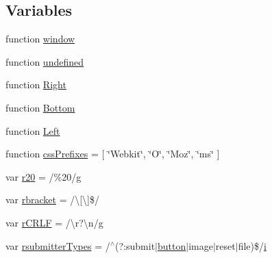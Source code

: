 \subsection*{Variables}
\begin{DoxyCompactItemize}
\item 
function \hyperlink{obj_2_release_2_package_2_package_tmp_2_scripts_2jquery-1_810_82_8js_a04a8a2bbfa9c15500892b8e5033d625b}{window}
\item 
function \hyperlink{obj_2_release_2_package_2_package_tmp_2_scripts_2jquery-1_810_82_8js_a08113a236cc18d2a9d5ce27e638012be}{undefined}
\item 
function \hyperlink{obj_2_release_2_package_2_package_tmp_2_scripts_2jquery-1_810_82_8js_ac7f66efc33d974809d85fc5bdb00c6eb}{Right}
\item 
function \hyperlink{obj_2_release_2_package_2_package_tmp_2_scripts_2jquery-1_810_82_8js_aff76c1cba4a00c678dfce0e0c5a5538a}{Bottom}
\item 
function \hyperlink{obj_2_release_2_package_2_package_tmp_2_scripts_2jquery-1_810_82_8js_abef68bf244a1159a49fe3a2c153a65d2}{Left}
\item 
function \hyperlink{obj_2_release_2_package_2_package_tmp_2_scripts_2jquery-1_810_82_8js_a2ed3892172b336458b8074254f4471da}{css\+Prefixes} = \mbox{[} \char`\"{}Webkit\char`\"{}, \char`\"{}O\char`\"{}, \char`\"{}Moz\char`\"{}, \char`\"{}ms\char`\"{} \mbox{]}
\item 
var \hyperlink{obj_2_release_2_package_2_package_tmp_2_scripts_2jquery-1_810_82_8js_a0e39f72d512af99fb5992d66f1a1c821}{r20} = /\%20/\hyperlink{_scripts_2respond_8min_8js_a103df269476e78897c9c4c6cb8f4eb06}{g}
\item 
var \hyperlink{obj_2_release_2_package_2_package_tmp_2_scripts_2jquery-1_810_82_8js_a07117e28ee58d2d2664cfbaf741e10c1}{rbracket} = /\textbackslash{}\mbox{[}\textbackslash{}\mbox{]}\$/
\item 
var \hyperlink{obj_2_release_2_package_2_package_tmp_2_scripts_2jquery-1_810_82_8js_a4fd9dfc4eb645b441a3e84730c50154b}{r\+C\+R\+L\+F} = /\textbackslash{}r?\textbackslash{}n/\hyperlink{_scripts_2respond_8min_8js_a103df269476e78897c9c4c6cb8f4eb06}{g}
\item 
var \hyperlink{obj_2_release_2_package_2_package_tmp_2_scripts_2jquery-1_810_82_8js_a0e9cd4ca08945afe827846f34a36c74a}{rsubmitter\+Types} = /$^\wedge$(?\+:submit$\vert$\hyperlink{_scripts_2bootstrap_8min_8js_a55e170814e74f6c3db8ae9ea3ba9054f}{button}$\vert$image$\vert$reset$\vert$file)\$/\hyperlink{_scripts_2respond_8min_8js_a5e25b1d1bed9ab5f3174b76d6a722180}{i}

\end{DoxyCompactItemize}
